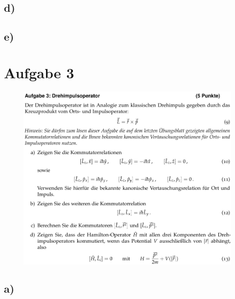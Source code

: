     \subsection{d)}

    \subsection{e)}


\section{Aufgabe 3}

    \begin{figure}[H]
        \centering
        \includegraphics[width=\textwidth]{images/Aufgabe3.jpg}
        \label{fig:3}
    \end{figure}

    \subsection{a)}

